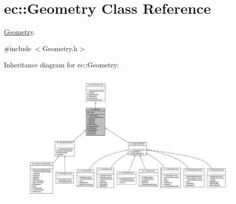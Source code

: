 \hypertarget{classec_1_1_geometry}{}\section{ec\+:\+:Geometry Class Reference}
\label{classec_1_1_geometry}


\mbox{\hyperlink{classec_1_1_geometry}{Geometry}}.  




{\ttfamily \#include $<$Geometry.\+h$>$}



Inheritance diagram for ec\+:\+:Geometry\+:\nopagebreak
\begin{figure}[H]
\begin{center}
\leavevmode
\includegraphics[width=350pt]{classec_1_1_geometry__inherit__graph}
\end{center}
\end{figure}


